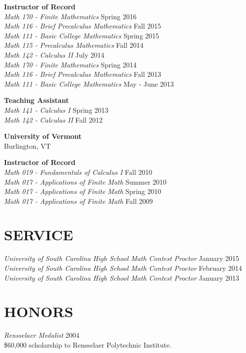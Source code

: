 \documentclass[line,overlapped]{res}
\begin{document}
\begin{resume}
         {\bf Instructor of Record}\\
         {\sl Math 170 - Finite Mathematics} \hfill Spring 2016\\
         {\sl Math 116 - Brief Precalculus Mathematics} \hfill Fall 2015\\
         {\sl Math 111 - Basic College Mathematics} \hfill Spring 2015\\
         {\sl Math 115 - Precalculus Mathematics} \hfill Fall 2014\\
         {\sl Math 142 - Calculus II} \hfill July 2014\\
         {\sl Math 170 - Finite Mathematics} \hfill Spring 2014\\
         {\sl Math 116 - Brief Precalculus Mathematics} \hfill Fall 2013\\
         {\sl Math 111 - Basic College Mathematics} \hfill May - June 2013

         {\bf Teaching Assistant}\\
         {\sl Math 141 - Calculus I} \hfill Spring 2013\\
         {\sl Math 142 - Calculus II} \hfill Fall 2012

         {\bf University of Vermont}\\Burlington, VT
         
         {\bf Instructor of Record}\\
         {\sl Math 019 - Fundamentals of Calculus I} \hfill Fall 2010\\
         {\sl Math 017 - Applications of Finite Math} \hfill Summer 2010\\
         {\sl Math 017 - Applications of Finite Math} \hfill Spring 2010\\
         {\sl Math 017 - Applications of Finite Math} \hfill Fall 2009\\
         
 \section{SERVICE}
         {\sl University of South Carolina High School Math Contest Proctor} \hfill January 2015\\
         {\sl University of South Carolina High School Math Contest Proctor} \hfill February 2014\\
         {\sl University of South Carolina High School Math Contest Proctor} \hfill January 2013

 \section{HONORS}
         {\sl Rensselaer Medalist} \hfill 2004\\
         \$60,000 scholarship to Rensselaer Polytechnic Institute.


\end{resume}
\end{document}
